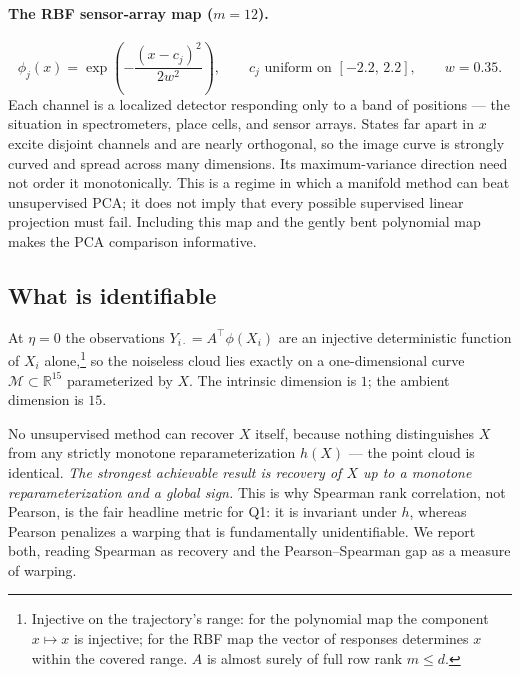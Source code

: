 \documentclass[11pt]{article}
\newcommand{\R}{\mathbb{R}}
\begin{document}
\paragraph{The RBF sensor-array map ($m=12$).}
\begin{equation}
\phi_j(x) = \exp\!\left(-\frac{(x-c_j)^2}{2w^2}\right) ,
\qquad c_j \text{ uniform on } [-2.2,\,2.2],
\qquad w = 0.35 .
\label{eq:featrbf}
\end{equation}
Each channel is a localized detector responding only to a band of positions ---
the situation in spectrometers, place cells, and sensor arrays. States far apart
in $x$ excite disjoint channels and are nearly orthogonal, so the image curve is
strongly curved and spread across many dimensions. Its maximum-variance direction
need not order it monotonically. This is a regime in which a manifold method can
beat unsupervised PCA; it does not imply that every possible supervised linear
projection must fail. Including this map and the gently bent polynomial map makes
the PCA comparison informative.

\subsection{What is identifiable}
\label{sec:identifiability}

At $\eta = 0$ the observations $Y_{i\cdot} = A^\top\phi(X_i)$ are an injective
deterministic function of $X_i$ alone,\footnote{Injective on the trajectory's
range: for the polynomial map the component $x\mapsto x$ is injective; for the
RBF map the vector of responses determines $x$ within the covered range. $A$ is
almost surely of full row rank $m \le d$.} so the noiseless cloud lies exactly on
a one-dimensional curve $\mathcal{M}\subset\R^{15}$ parameterized by $X$. The
intrinsic dimension is $1$; the ambient dimension is $15$.

No unsupervised method can recover $X$ itself, because nothing distinguishes $X$
from any strictly monotone reparameterization $h(X)$ --- the point cloud is
identical. \emph{The strongest achievable result is recovery of $X$ up to a
monotone reparameterization and a global sign.} This is why Spearman rank
correlation, not Pearson, is the fair headline metric for Q1: it is invariant
under $h$, whereas Pearson penalizes a warping that is fundamentally
unidentifiable. We report both, reading Spearman as recovery and the
Pearson--Spearman gap as a measure of warping.

\end{document}
